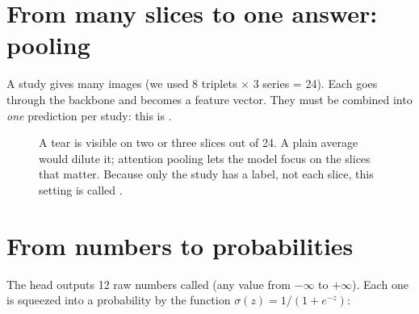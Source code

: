\section{From many slices to one answer: pooling}

A study gives many images (we used 8 triplets $\times$ 3 series = 24). Each goes through the backbone and becomes a
feature vector. They must be combined into \emph{one} prediction per study: this is .

\begin{figure}[H]
\centering
{}
\caption{A tear is visible on two or three slices out of 24. A plain average would dilute it; attention pooling lets
the model focus on the slices that matter. Because only the study has a label, not each slice, this setting is
called .}
\label{fig:attnpool}
\end{figure}

\section{From numbers to probabilities}

The head outputs 12 raw numbers called  (any value from $-\infty$ to $+\infty$). Each one is squeezed
into a probability by the  function $\sigma(z) = 1/(1+e^{-z})$:

